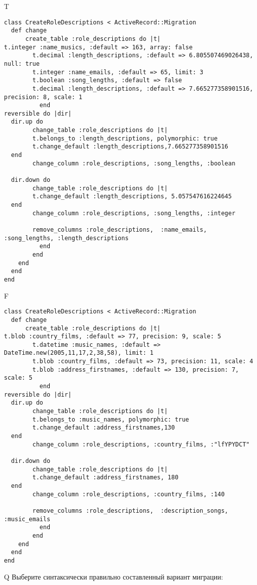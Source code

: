 T
\begin{verbatim}
class CreateRoleDescriptions < ActiveRecord::Migration
  def change
	  create_table :role_descriptions do |t|
t.integer :name_musics, :default => 163, array: false
		t.decimal :length_descriptions, :default => 6.805507469026438, null: true
		t.integer :name_emails, :default => 65, limit: 3
		t.boolean :song_lengths, :default => false
		t.decimal :length_descriptions, :default => 7.665277358901516, precision: 8, scale: 1
		  end
reversible do |dir|
  dir.up do
		change_table :role_descriptions do |t|
		t.belongs_to :length_descriptions, polymorphic: true
 		t.change_default :length_descriptions,7.665277358901516
  end
 		change_column :role_descriptions, :song_lengths, :boolean
   
  dir.down do
		change_table :role_descriptions do |t|
		t.change_default :length_descriptions, 5.057547616224645
  end
 		change_column :role_descriptions, :song_lengths, :integer
   
		remove_columns :role_descriptions,  :name_emails, :song_lengths, :length_descriptions 
	      end
	    end
    end 
  end
end

\end{verbatim}

F
\begin{verbatim}
class CreateRoleDescriptions < ActiveRecord::Migration
  def change
	  create_table :role_descriptions do |t|
t.blob :country_films, :default => 77, precision: 9, scale: 5
		t.datetime :music_names, :default => DateTime.new(2005,11,17,2,38,58), limit: 1
		t.blob :country_films, :default => 73, precision: 11, scale: 4
		t.blob :address_firstnames, :default => 130, precision: 7, scale: 5
		  end
reversible do |dir|
  dir.up do
		change_table :role_descriptions do |t|
		t.belongs_to :music_names, polymorphic: true
 		t.change_default :address_firstnames,130
  end
 		change_column :role_descriptions, :country_films, :"lfYPYDCT"
   
  dir.down do
		change_table :role_descriptions do |t|
		t.change_default :address_firstnames, 180
  end
 		change_column :role_descriptions, :country_films, :140
   
		remove_columns :role_descriptions,  :description_songs, :music_emails 
	      end
	    end
    end 
  end
end

\end{verbatim}

Q
Выберите синтаксически правильно составленный вариант миграции:

